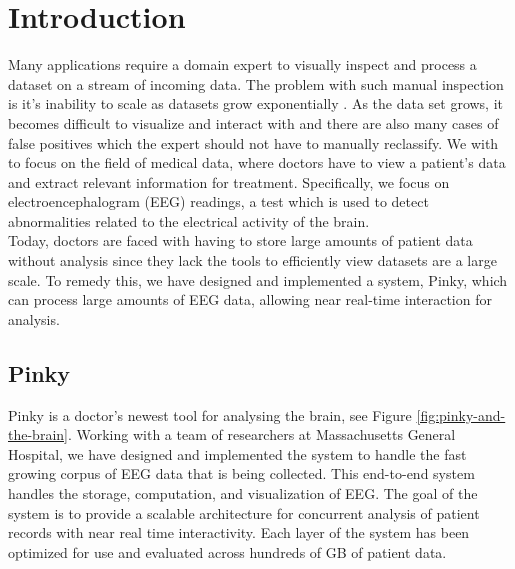 \chapter{Introduction}\label{intro-ch}

Many applications require a domain expert to visually inspect and process a
dataset on a stream of incoming data. The problem with such manual inspection
is it's inability to scale as datasets grow exponentially \cite{exp-growth}. As
the data set grows, it becomes difficult to visualize and interact with
\cite{immens} and there are also many cases of false positives which the expert
should not have to manually reclassify. We with to focus on the field of
medical data, where doctors have to view a patient's data and extract relevant
information for treatment. Specifically, we focus on electroencephalogram (EEG)
readings, a test which is used to detect abnormalities related to the
electrical activity of the brain. \\

Today, doctors are faced with having to store large amounts of patient data
without analysis since they lack the tools to efficiently view datasets are a
large scale. To remedy this, we have designed and implemented a system, Pinky,
which can process large amounts of EEG data, allowing near real-time
interaction for analysis.


\section{Pinky}

Pinky is a doctor's newest tool for analysing the brain, see Figure
\ref{fig:pinky-and-the-brain}. Working with a team of researchers at
Massachusetts General Hospital, we have designed and implemented the system to
handle the fast growing corpus of EEG data that is being collected. This
end-to-end system handles the storage, computation, and visualization of EEG.
The goal of the system is to provide a scalable architecture for concurrent
analysis of patient records with near real time interactivity. Each layer of
the system has been optimized for use and evaluated across hundreds of GB of
patient data. \\


